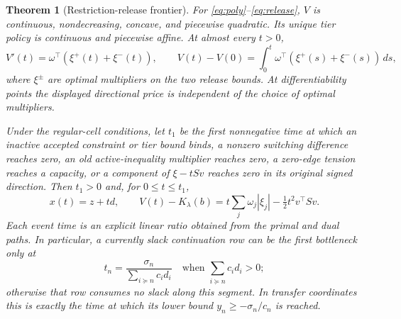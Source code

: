 \documentclass[11pt,letterpaper]{article}
\newtheorem{theorem}{Theorem}[section]
\theoremstyle{definition}\newtheorem{assumption}[theorem]{Assumption}
\begin{document}
\begin{theorem}[Restriction-release frontier]\label{thm:release}
For \eqref{eq:poly}--\eqref{eq:release}, $V$ is continuous, nondecreasing, concave, and piecewise quadratic. Its unique tier policy is continuous and piecewise affine. At almost every $t>0$,
\begin{equation}\label{eq:restriction-rent}
 V'(t)=\omega^\top(\xi^+(t)+\xi^-(t)),
 \qquad V(t)-V(0)=\int_0^t\omega^\top(\xi^+(s)+\xi^-(s))\,ds,
\end{equation}
where $\xi^\pm$ are optimal multipliers on the two release bounds. At differentiability points the displayed directional price is independent of the choice of optimal multipliers.

Under the regular-cell conditions, let $t_1$ be the first nonnegative time at which an inactive accepted constraint or tier bound binds, a nonzero switching difference reaches zero, an old active-inequality multiplier reaches zero, a zero-edge tension reaches a capacity, or a component of $\xi-tSv$ reaches zero in its original signed direction. Then $t_1>0$ and, for $0\leq t\leq t_1$,
\begin{equation}\label{eq:release-exact}
 x(t)=z+td,\qquad
 V(t)-K_\lambda(b)=t\sum_j\omega_j|\xi_j|-\tfrac12t^2 v^\top Sv.
\end{equation}
Each event time is an explicit linear ratio obtained from the primal and dual paths. In particular, a currently slack continuation row can be the first bottleneck only at
\begin{equation}\label{eq:slack-break}
 t_n=\frac{\sigma_n}{\sum_{i\succeq n}c_i d_i}
 \quad\text{when }\sum_{i\succeq n}c_i d_i>0;
\end{equation}
otherwise that row consumes no slack along this segment. In transfer coordinates this is exactly the time at which its lower bound $y_n\geq-\sigma_n/c_n$ is reached.
\end{theorem}
\end{document}
